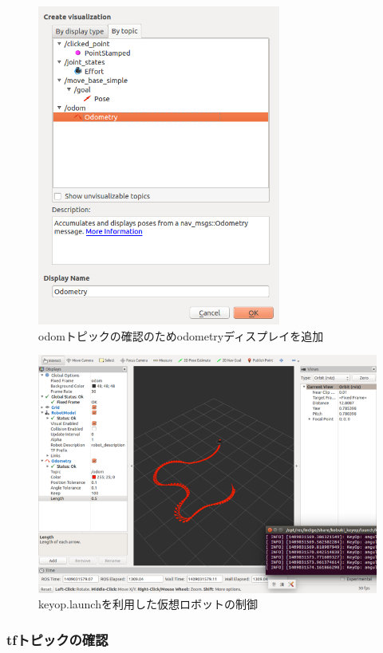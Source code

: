 \begin{itemize}
\begin{figure}[htp]
  \centering
  \includegraphics[width=8cm]{pictures/chapter9/pic_09_22.png}
  \caption{odomトピックの確認のためodometryディスプレイを追加}
\end{figure}

\begin{figure}[htp]
  \centering
  \includegraphics[width=12cm]{pictures/chapter9/pic_09_23.png}
  \caption{keyop.launchを利用した仮想ロボットの制御}
\end{figure}

\subsubsection{tfトピックの確認}


\end{itemize}
